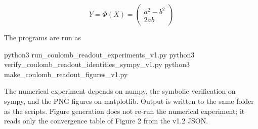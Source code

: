 \documentclass[
  a4paper,
]{article}
\newenvironment{Shaded}{}{}
\newcommand{\NormalTok}[1]{#1}
\begin{document}
\[
Y=\Phi(X)=\begin{pmatrix}a^2-b^2\\2ab\end{pmatrix}
\]

The programs are run as

\begin{Shaded}
\begin{Highlighting}[]
\NormalTok{python3 run\_coulomb\_readout\_experiments\_v1.py}
\NormalTok{python3 verify\_coulomb\_readout\_identities\_sympy\_v1.py}
\NormalTok{python3 make\_coulomb\_readout\_figures\_v1.py}
\end{Highlighting}
\end{Shaded}

The numerical experiment depends on numpy, the symbolic verification on
sympy, and the PNG figures on matplotlib. Output is written to the same
folder as the scripts. Figure generation does not re-run the numerical
experiment; it reads only the convergence table of Figure 2 from the
v1.2 JSON.
\end{document}

